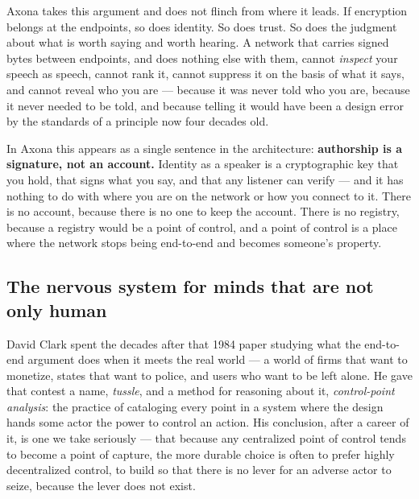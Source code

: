 \documentclass[nobib,justified]{tufte-handout}
\begin{document}
Axona takes this argument and does not flinch from where it leads. If
encryption belongs at the endpoints, so does identity. So does trust. So does
the judgment about what is worth saying and worth hearing. A network that
carries signed bytes between endpoints, and does nothing else with them,
cannot \emph{inspect} your speech as speech, cannot rank it, cannot suppress
it on the basis of what it says, and cannot reveal who you are --- because it
was never told who you are, because it never needed to be told, and because
telling it would have been a design error by the standards of a principle now
four decades old.

In Axona this appears as a single sentence in the architecture:
\textbf{authorship is a signature, not an account.} Identity as a speaker is a
cryptographic key that you hold, that signs what you say, and that any listener
can verify --- and it has nothing to do with where you are on the network or
how you connect to it. There is no account, because there is no one to keep the
account. There is no registry, because a registry would be a point of control,
and a point of control is a place where the network stops being end-to-end and
becomes someone's property.

\subsection{The nervous system for minds that are not only human}

David Clark spent the decades after that 1984 paper studying what the
end-to-end argument does when it meets the real world --- a world of firms
that want to monetize, states that want to police, and users who want to be
left alone. He gave that contest a name, \emph{tussle}, and a method for
reasoning about it, \emph{control-point analysis}: the practice of cataloging
every point in a system where the design hands some actor the power to control
an action. His conclusion, after a career of it, is one we
take seriously --- that because any centralized point of control tends to
become a point of capture, the more durable choice is often to prefer highly
decentralized control, to build so that there is no lever for an adverse actor
to seize, because the lever does not exist.
\end{document}
